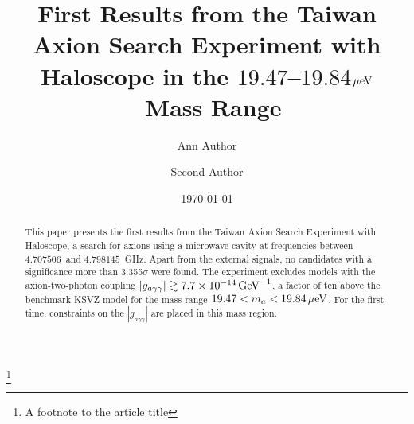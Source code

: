 \documentclass[%
preprint, %
 amsmath,amssymb,
 aps,
]{revtex4-2}
\newcommand{\gagg}{\ensuremath{\left|g_{a\gamma\gamma}\right|}}
\newcommand{\ma}{\ensuremath{m_a}}
\newcommand{\muevcc}{\ensuremath{\,\mu\text{e\hspace{-.08em}V}}}
\newcommand{\GeVinv}{\ensuremath{\,\text{Ge\hspace{-.08em}V}^{-1}}}
\newcommand{\flo}{\ensuremath{4.707506}}
\newcommand{\fhi}{\ensuremath{4.798145}}
\newcommand{\mlo}{\ensuremath{19.47}}
\newcommand{\mhi}{\ensuremath{19.84}}
\newcommand{\avelimit}{\ensuremath{7.7\times 10^{-14}}}
\begin{document}

\title{First Results from the Taiwan Axion Search Experiment with Haloscope in the \mlo--\mhi\muevcc\ Mass Range}%
\thanks{A footnote to the article title}%

\author{Ann Author}
\author{Second Author}%
%



\date{\today}%

\begin{abstract}

 This paper presents the first results from the 
Taiwan Axion Search Experiment with Haloscope, a search for axions 
using a microwave cavity at frequencies between \flo\ and \fhi~GHz. 
Apart from the external signals, no candidates with 
a significance more than 3.355$\sigma$ were found. The experiment excludes 
models with the axion-two-photon 
coupling $\gagg\gtrsim \avelimit\GeVinv$, a factor of ten above the benchmark 
KSVZ model for the mass range $\mlo < \ma < \mhi \muevcc$. For the first time, 
constraints on the $\gagg$ are placed in this mass region. 


\end{abstract}

\maketitle
\end{document}
